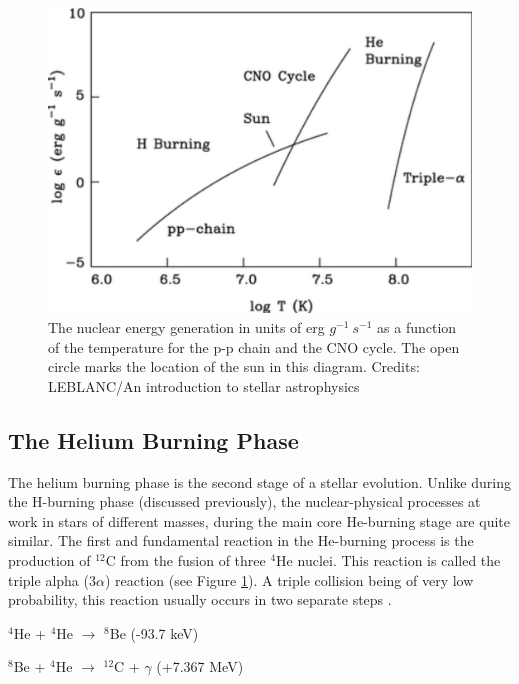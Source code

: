 \begin{figure}[!ht]
\centering
\includegraphics[width=\textwidth, angle=0]{Img/pp.png}
\caption{The nuclear energy generation in units of erg $g^{-1}~s^{-1}$ as a function of the temperature for the p-p chain and the CNO cycle. The open circle marks the location of the sun in this diagram. Credits: LEBLANC/An introduction to stellar astrophysics} 
\label{temperature}
\end{figure}




\subsection{The Helium Burning Phase}

The helium burning phase is the second stage of a stellar evolution. Unlike during the H-burning phase (discussed previously), the nuclear-physical processes at work in stars of different masses, during the main core He-burning stage are quite similar. The first and fundamental reaction in the He-burning process is the production of $^{12}$C from the fusion of three $^{4}$He nuclei. This reaction is called the triple alpha ($3\alpha$) reaction (see Figure \ref{temperature}). A triple collision being of very low probability, this reaction usually occurs in two separate steps \citep{1955ApJS....2....1H,1960AJ.....65T.490H,1970ApJ...161..587I,2019ApJ...878...49W}.

\vspace{2mm}
$^{4}$He + $^{4}$He $\longrightarrow$ $^{8}$Be (-93.7 keV)

$^{8}$Be + $^{4}$He $\longrightarrow$ $^{12}$C + $\gamma$ (+7.367 MeV)
\vspace{2mm}

